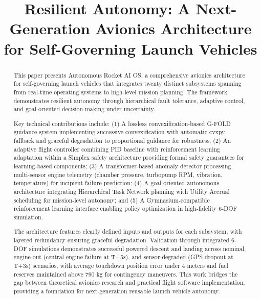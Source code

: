 \documentclass[10pt, conference, compsocconf]{IEEEtran}
\begin{document}
\title{Resilient Autonomy: A Next-Generation Avionics Architecture for Self-Governing Launch Vehicles}

\author{
}
\maketitle

\begin{abstract}
This paper presents Autonomous Rocket AI OS, a comprehensive avionics architecture for self-governing launch vehicles that integrates twenty distinct subsystems spanning from real-time operating systems to high-level mission planning. The framework demonstrates resilient autonomy through hierarchical fault tolerance, adaptive control, and goal-oriented decision-making under uncertainty.

Key technical contributions include: (1) A lossless convexification-based G-FOLD guidance system implementing successive convexification with automatic cvxpy fallback and graceful degradation to proportional guidance for robustness; (2) An adaptive flight controller combining PID baseline with reinforcement learning adaptation within a Simplex safety architecture providing formal safety guarantees for learning-based components; (3) A transformer-based anomaly detector processing multi-sensor engine telemetry (chamber pressure, turbopump RPM, vibration, temperature) for incipient failure prediction; (4) A goal-oriented autonomous architecture integrating Hierarchical Task Network planning with Utility Accrual scheduling for mission-level autonomy; and (5) A Gymnasium-compatible reinforcement learning interface enabling policy optimization in high-fidelity 6-DOF simulation.

The architecture features clearly defined inputs and outputs for each subsystem, with layered redundancy ensuring graceful degradation. Validation through integrated 6-DOF simulations demonstrates successful powered descent and landing across nominal, engine-out (central engine failure at T+5s), and sensor-degraded (GPS dropout at T+3s) scenarios, with average touchdown position error under 4 meters and fuel reserves maintained above 790 kg for contingency maneuvers. This work bridges the gap between theoretical avionics research and practical flight software implementation, providing a foundation for next-generation reusable launch vehicle autonomy.
\end{abstract}
\end{document}
